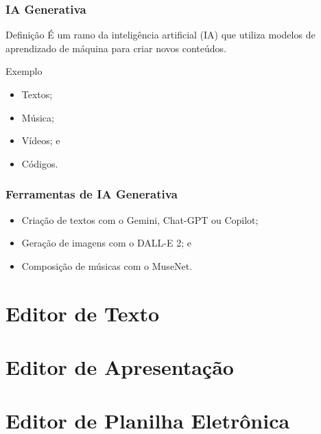 \documentclass[aspectratio=169]{beamer} %
\begin{document}
\begin{frame}
	\frametitle{IA Generativa}
	
	\begin{block}{Definição}
		 É um ramo da inteligência artificial (IA) que utiliza modelos de aprendizado de máquina para criar novos conteúdos.
	\end{block}\vfill
	
	\begin{exampleblock}{Exemplo}
		\begin{itemize}
			\item Textos;
			\item Música;
			\item Vídeos; e
			\item Códigos.
		\end{itemize}
	\end{exampleblock}
\end{frame}

\begin{frame}
	\frametitle{Ferramentas de IA Generativa}
	
	\begin{itemize}
		\item Criação de textos com o Gemini, Chat-GPT ou Copilot;
		\item Geração de imagens com o DALL-E 2; e
		\item Composição de músicas com o MuseNet.
	\end{itemize}
\end{frame}

\section{Editor de Texto}

\section{Editor de Apresentação}

\section{Editor de Planilha Eletrônica}
\end{document}
